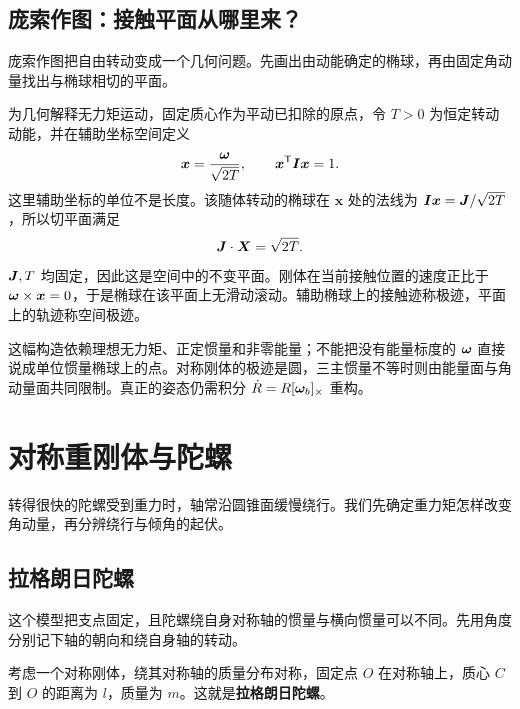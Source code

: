 \subsection{庞索作图：接触平面从哪里来？}
庞索作图把自由转动变成一个几何问题。先画出由动能确定的椭球，再由固定角动量找出与椭球相切的平面。

为几何解释无力矩运动，固定质心作为平动已扣除的原点，令 $T>0$ 为恒定转动动能，并在辅助坐标空间定义
\[
\boldsymbol x=\frac{\boldsymbol{\omega}}{\sqrt{2T}},\qquad \boldsymbol x^{\mathsf T}\boldsymbol{I}\boldsymbol x=1.
\]
这里辅助坐标的单位不是长度。该随体转动的椭球在 $\boldsymbol x$ 处的法线为 $\boldsymbol{I}\boldsymbol x=\boldsymbol{J}/\sqrt{2T}$，所以切平面满足
\[
\boldsymbol{J}\cdot{\boldsymbol X}=\sqrt{2T}.
\]
$\boldsymbol{J},T$ 均固定，因此这是空间中的不变平面。刚体在当前接触位置的速度正比于 $\boldsymbol{\omega}\times\boldsymbol x=0$，于是椭球在该平面上无滑动滚动。辅助椭球上的接触迹称极迹，平面上的轨迹称空间极迹。

这幅构造依赖理想无力矩、正定惯量和非零能量；不能把没有能量标度的 $\boldsymbol{\omega}$ 直接说成单位惯量椭球上的点。对称刚体的极迹是圆，三主惯量不等时则由能量面与角动量面共同限制。真正的姿态仍需积分 $\dot R=R[\boldsymbol{\omega}_b]_\times$ 重构。


\section{对称重刚体与陀螺}

转得很快的陀螺受到重力时，轴常沿圆锥面缓慢绕行。我们先确定重力矩怎样改变角动量，再分辨绕行与倾角的起伏。

\subsection{拉格朗日陀螺}

这个模型把支点固定，且陀螺绕自身对称轴的惯量与横向惯量可以不同。先用角度分别记下轴的朝向和绕自身轴的转动。

考虑一个对称刚体，绕其对称轴的质量分布对称，固定点 \(O\) 在对称轴上，质心 \(C\) 到 \(O\) 的距离为 \(l\)，质量为 \(m\)。这就是\textbf{拉格朗日陀螺}。

